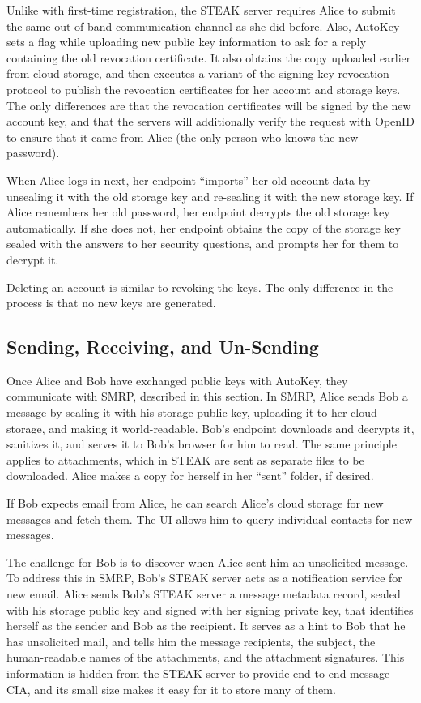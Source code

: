 Unlike with first-time registration, the STEAK server requires Alice to submit the same out-of-band communication channel as she did before.  Also, AutoKey sets a flag while uploading new public key information to ask for a reply containing the old revocation certificate.  It also obtains the copy uploaded earlier from cloud storage, and then executes a variant of the signing key revocation protocol to publish the revocation certificates for her account and storage keys.  The only differences are that the revocation certificates will be signed by the new account key, and that the servers will additionally verify the request with OpenID to ensure that it came from Alice (the only person who knows the new password).

When Alice logs in next, her endpoint ``imports'' her old account data by unsealing it with the old storage key and re-sealing it with the new storage key.  If Alice remembers her old password, her endpoint decrypts the old storage key automatically.  If she does not, her endpoint obtains the copy of the storage key sealed with the answers to her security questions, and prompts her for them to decrypt it.

Deleting an account is similar to revoking the keys.  The only difference in the process is that no new keys are generated.

\subsection{Sending, Receiving, and Un-Sending}
Once Alice and Bob have exchanged public keys with AutoKey, they communicate with SMRP, described in this section.  In SMRP, Alice sends Bob a message by sealing it with his storage public key, uploading it to her cloud storage, and making it world-readable. Bob’s endpoint downloads and decrypts it, sanitizes it, and serves it to Bob’s browser for him to read. The same principle applies to attachments, which in STEAK are sent as separate files to be downloaded.  Alice makes a copy for herself in her ``sent'' folder, if desired.

If Bob expects email from Alice, he can search Alice’s cloud storage for new messages and fetch them.  The UI allows him to query individual contacts for new messages.

The challenge for Bob is to discover when Alice sent him an unsolicited message.  To address this in SMRP, Bob’s STEAK server acts as a notification service for new email.  Alice sends Bob's STEAK server a message metadata record, sealed with his storage public key and signed with her signing private key, that identifies herself as the sender and Bob as the recipient.  It serves as a hint to Bob that he has unsolicited mail, and tells him the message recipients, the subject, the human-readable names of the attachments, and the attachment signatures.  This information is hidden from the STEAK server to provide end-to-end message CIA, and its small size makes it easy for it to store many of them.

